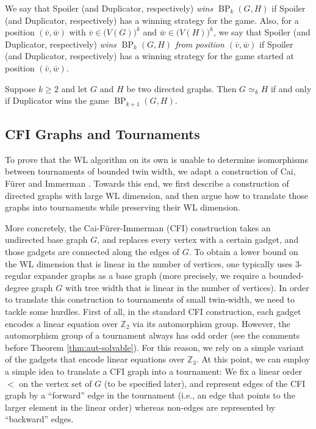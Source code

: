 \documentclass{theoretics}
\newcommand{\ZZ}{{\mathbb Z}}
\DeclareMathOperator{\BP}{BP}
\begin{document}
We say that Spoiler (and Duplicator, respectively) \emph{wins $\BP_k(G,H)$} if Spoiler (and Duplicator, respectively) has a winning strategy for the game.
Also, for a position $(\bar v,\bar w)$ with $\bar v \in \big(V(G)\big)^k$ and $\bar w \in \big(V(H)\big)^k$, we say that Spoiler (and Duplicator, respectively) \emph{wins $\BP_k(G,H)$ from position $(\bar v,\bar w)$} if Spoiler (and Duplicator, respectively) has a winning strategy for the game started at position $(\bar v,\bar w)$.

\begin{theorem}
 \label{thm:eq-wl-pebble}
 Suppose $k \geq 2$ and let $G$ and $H$ be two directed graphs.
 Then $G \simeq_k H$ if and only if Duplicator wins the game $\BP_{k+1}(G,H)$.
\end{theorem}


\subsection{CFI Graphs and Tournaments}

To prove that the WL algorithm on its own is unable to determine isomorphisms between tournaments of bounded twin width, we adapt a construction of Cai, F{\"{u}}rer and Immerman \cite{CaiFI92}.
Towards this end, we first describe a construction of directed graphs with large WL dimension, and then argue how to translate those graphs into tournaments while preserving their WL dimension.

More concretely, the Cai-F{\"{u}}rer-Immerman (CFI) construction \cite{CaiFI92} takes an undirected base graph $G$, and replaces every vertex with a certain gadget, and those gadgets are connected along the edges of $G$.
To obtain a lower bound on the WL dimension that is linear in the number of vertices, one typically uses $3$-regular expander graphs as a base graph (more precisely, we require a bounded-degree graph $G$ with tree width that is linear in the number of vertices).
In order to translate this construction to tournaments of small twin-width, we need to tackle some hurdles.
First of all, in the standard CFI construction, each gadget encodes a linear equation over $\ZZ_2$ via its automorphism group.
However, the automorphism group of a tournament always has odd order (see the comments before Theorem \ref{thm:aut-solvable}).
For this reason, we rely on a simple variant of the gadgets that encode linear equations over $\ZZ_3$.
At this point, we can employ a simple idea to translate a CFI graph into a tournament:
We fix a linear order $<$ on the vertex set of $G$ (to be specified later), and represent edges of the CFI graph by a ``forward'' edge in the tournament (i.e., an edge that points to the larger element in the linear order) whereas non-edges are represented by ``backward'' edges.
\end{document}
